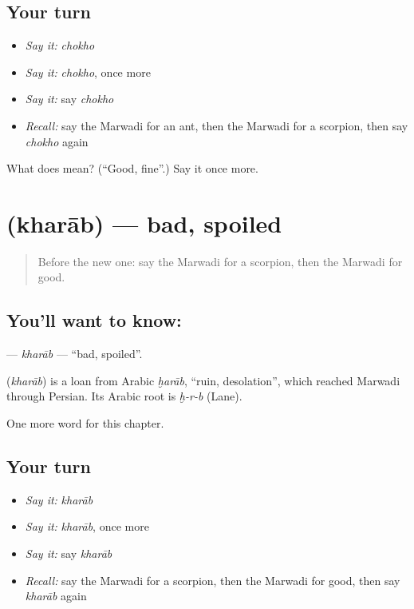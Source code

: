 \subsection*{Your turn}
\begin{itemize}
\raggedright
  \item \emph{Say it:} \emph{chokho}
  \item \emph{Say it:} \emph{chokho}, once more
  \item \emph{Say it:} say \emph{chokho}
  \item \emph{Recall:} say the Marwadi for an ant, then the Marwadi for a scorpion, then say \emph{chokho} again
\end{itemize}

\begin{tcolorbox}[breakable,colback=teal!4,colframe=teal!35!black,title={Before you move on}]
What does  mean? (\textquotedblleft{}Good, fine\textquotedblright{}.) Say it once more.
\end{tcolorbox}
\section[\texorpdfstring{\mw{खराब} (kharāb)}{खराब (kharāb)}]{ (kharāb) — bad, spoiled}

\label{lesson:MW-C141-kharab}



\begin{quote}
Before the new one: say the Marwadi for a scorpion, then the Marwadi for good.
\end{quote}

\subsection*{You'll want to know: }
\textbf{} — \emph{kharāb} — \textquotedblleft{}bad, spoiled\textquotedblright{}.

\begin{cousinweb}
\textbf{} (\emph{kharāb}) is a loan from Arabic \emph{ḫarāb}, \textquotedblleft{}ruin, desolation\textquotedblright{}, which reached Marwadi through Persian. Its Arabic root is \emph{ḫ-r-b} (Lane).
\end{cousinweb}

\begin{grammarlens}[title={What you've built}]
One more word for this chapter.
\end{grammarlens}

\subsection*{Your turn}
\begin{itemize}
\raggedright
  \item \emph{Say it:} \emph{kharāb}
  \item \emph{Say it:} \emph{kharāb}, once more
  \item \emph{Say it:} say \emph{kharāb}
  \item \emph{Recall:} say the Marwadi for a scorpion, then the Marwadi for good, then say \emph{kharāb} again
\end{itemize}

